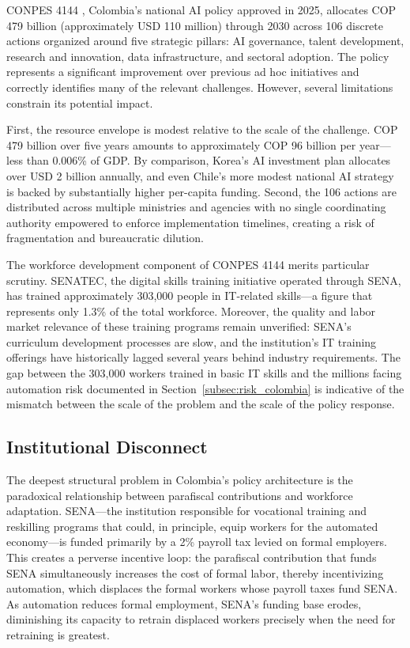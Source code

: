 \documentclass{article}
\begin{document}
CONPES 4144 \cite{conpes4144}, Colombia's national AI policy approved in 2025, allocates COP 479 billion (approximately USD 110 million) through 2030 across 106 discrete actions organized around five strategic pillars: AI governance, talent development, research and innovation, data infrastructure, and sectoral adoption. The policy represents a significant improvement over previous ad hoc initiatives and correctly identifies many of the relevant challenges. However, several limitations constrain its potential impact.

First, the resource envelope is modest relative to the scale of the challenge. COP 479 billion over five years amounts to approximately COP 96 billion per year---less than 0.006\% of GDP. By comparison, Korea's AI investment plan allocates over USD 2 billion annually, and even Chile's more modest national AI strategy is backed by substantially higher per-capita funding. Second, the 106 actions are distributed across multiple ministries and agencies with no single coordinating authority empowered to enforce implementation timelines, creating a risk of fragmentation and bureaucratic dilution.

The workforce development component of CONPES 4144 merits particular scrutiny. SENATEC, the digital skills training initiative operated through SENA, has trained approximately 303,000 people in IT-related skills---a figure that represents only 1.3\% of the total workforce. Moreover, the quality and labor market relevance of these training programs remain unverified: SENA's curriculum development processes are slow, and the institution's IT training offerings have historically lagged several years behind industry requirements. The gap between the 303,000 workers trained in basic IT skills and the millions facing automation risk documented in Section~\ref{subsec:risk_colombia} is indicative of the mismatch between the scale of the problem and the scale of the policy response.

\subsection{Institutional Disconnect}
\label{subsec:disconnect}

The deepest structural problem in Colombia's policy architecture is the paradoxical relationship between parafiscal contributions and workforce adaptation. SENA---the institution responsible for vocational training and reskilling programs that could, in principle, equip workers for the automated economy---is funded primarily by a 2\% payroll tax levied on formal employers. This creates a perverse incentive loop: the parafiscal contribution that funds SENA simultaneously increases the cost of formal labor, thereby incentivizing automation, which displaces the formal workers whose payroll taxes fund SENA. As automation reduces formal employment, SENA's funding base erodes, diminishing its capacity to retrain displaced workers precisely when the need for retraining is greatest.
\end{document}
